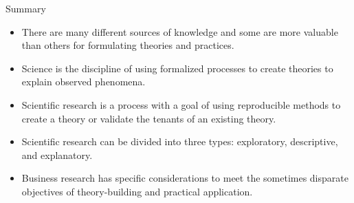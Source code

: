 \begin{center}
	\begin{tkawybox}{Summary}
		\begin{itemize}
			\item There are many different sources of knowledge and some are more valuable than others for formulating theories and practices.
			\item Science is the discipline of using formalized processes to create theories to explain observed phenomena.
			\item Scientific research is a process with a goal of using reproducible methods to create a theory or validate the tenants of an existing theory.
			\item Scientific research can be divided into three types: exploratory, descriptive, and explanatory.
			\item Business research has specific considerations to meet the sometimes disparate objectives of theory-building and practical application.
		\end{itemize}
	\end{tkawybox}
\end{center}
